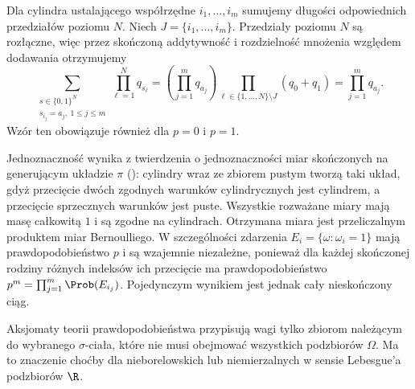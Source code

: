 \begin{przyklad}
Dla cylindra ustalającego współrzędne $i_1,\ldots,i_m$
sumujemy długości odpowiednich przedziałów poziomu $N$.
Niech $J=\{i_1,\ldots,i_m\}$. Przedziały poziomu $N$
są rozłączne, więc przez skończoną addytywność i rozdzielność
mnożenia względem dodawania otrzymujemy
\[
\sum_{\substack{s\in\{0,1\}^N\\s_{i_j}=a_j,\ 1\leq j\leq m}}
\prod_{\ell=1}^N q_{s_\ell}
=\left(\prod_{j=1}^m q_{a_j}\right)
 \prod_{\ell\in\{1,\ldots,N\}\setminus J}(q_0+q_1)
=\prod_{j=1}^m q_{a_j}.
\]
Wzór ten obowiązuje również dla $p=0$ i $p=1$.

Jednoznaczność wynika z twierdzenia o jednoznaczności miar
skończonych na generującym układzie $\pi$
():
cylindry wraz ze zbiorem pustym tworzą taki układ, gdyż
przecięcie dwóch zgodnych warunków cylindrycznych jest cylindrem,
a przecięcie sprzecznych warunków jest puste. Wszystkie rozważane
miary mają masę całkowitą $1$ i są zgodne na cylindrach.
Otrzymana miara jest przeliczalnym produktem miar Bernoulliego.
W szczególności zdarzenia $E_i=\{\omega:\omega_i=1\}$ mają
prawdopodobieństwo $p$ i są wzajemnie niezależne, ponieważ
dla każdej skończonej rodziny różnych indeksów ich przecięcie
ma prawdopodobieństwo $p^m=\prod_{j=1}^m\Prob(E_{i_j})$.
Pojedynczym wynikiem jest jednak cały nieskończony ciąg.
\end{przyklad}

\begin{uwaga}
Aksjomaty teorii prawdopodobieństwa przypisują wagi tylko
zbiorom należącym do wybranego $\sigma$-ciała, które nie musi
obejmować wszystkich podzbiorów $\Omega$. Ma to znaczenie choćby dla
nieborelowskich lub niemierzalnych w sensie Lebesgue'a podzbiorów $\R$.
\end{uwaga}

